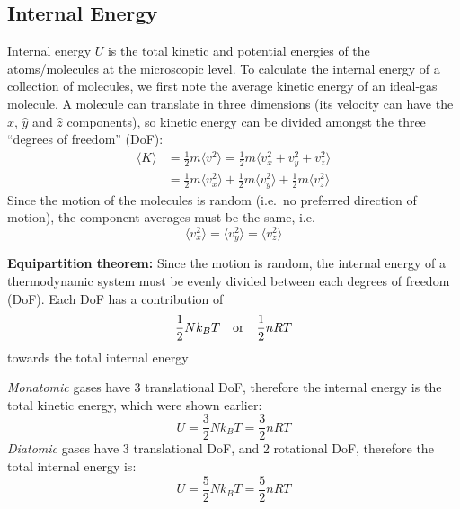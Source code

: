 \subsection{Internal Energy}

Internal energy $U$ is the total kinetic and potential energies of the
atoms/molecules at the microscopic level. To calculate the internal energy of a
collection of molecules, we first note the average kinetic energy of an
ideal-gas molecule. A molecule can translate in three dimensions (its velocity
can have the $\hat x$, $\hat y$ and $\hat z$ components), so kinetic energy can
be divided amongst the three ``degrees of freedom'' (DoF):
\begin{align*}
  \langle K \rangle&=\frac12m\langle v^2\rangle
  =\frac12m\langle v_x^2+v_y^2+v_z^2\rangle\\
  &=\frac12m\langle v_x^2\rangle+\frac12m\langle v_y^2\rangle+
  \frac12m\langle v_z^2\rangle
\end{align*}
Since the motion of the molecules is random (i.e.\ no preferred direction of
motion), the component averages must be the same, i.e.
\begin{equation}
  \langle v_x^2\rangle=\langle v_y^2\rangle=\langle v_z^2\rangle
\end{equation}

\begin{definition}
  \textbf{Equipartition theorem:} Since the motion is random, the internal
  energy of a thermodynamic system must be evenly divided between each degrees
  of freedom (DoF). Each DoF has a contribution of
  \begin{equation*}
    \frac12Nk_BT\quad\text{\normalsize or}\quad\frac12nRT
  \end{equation*}
  towards the total internal energy
\end{definition}

\emph{Monatomic} gases have 3 translational DoF, therefore the internal
energy is the total kinetic energy, which were shown earlier:
\begin{equation}
  U=\frac32Nk_BT=\frac32nRT
\end{equation}
%
\emph{Diatomic} gases
have 3 translational DoF, and 2 rotational DoF, therefore the total internal
energy is:
\begin{equation}
  U=\frac52Nk_BT=\frac52nRT
\end{equation}

